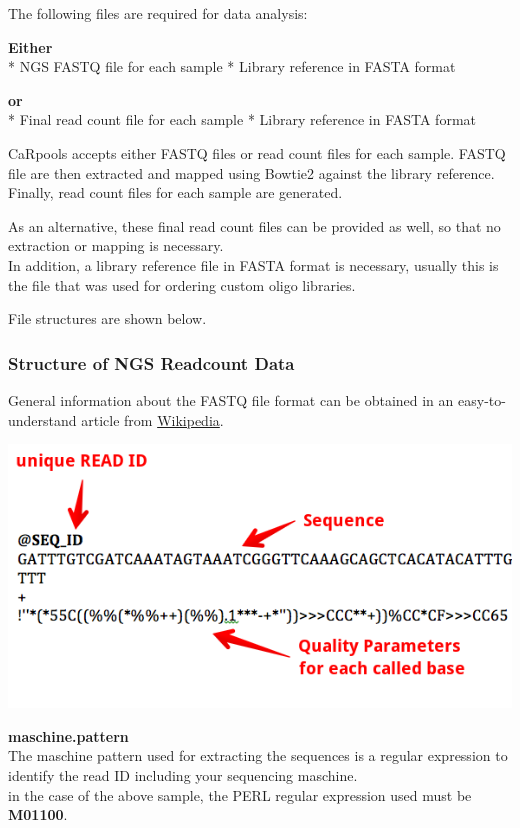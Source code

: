 \documentclass[]{article}
\begin{document}
The following files are required for data analysis:

\textbf{Either}\\
* NGS FASTQ file for each sample * Library reference in FASTA format

\textbf{or}\\
* Final read count file for each sample * Library reference in FASTA
format

CaRpools accepts either FASTQ files or read count files for each sample.
FASTQ file are then extracted and mapped using Bowtie2 against the
library reference. Finally, read count files for each sample are
generated.

As an alternative, these final read count files can be provided as well,
so that no extraction or mapping is necessary.\\
In addition, a library reference file in FASTA format is necessary,
usually this is the file that was used for ordering custom oligo
libraries.

File structures are shown below.

\subsubsection{Structure of NGS Readcount
Data}\label{structure-of-ngs-readcount-data}

General information about the FASTQ file format can be obtained in an
easy-to-understand article from
\href{https://en.wikipedia.org/wiki/FASTQ_format}{Wikipedia}.

\includegraphics{./pictures/fastq-format.png}

\textbf{maschine.pattern}\\
The maschine pattern used for extracting the sequences is a regular
expression to identify the read ID including your sequencing maschine.\\
in the case of the above sample, the PERL regular expression used must
be \textbf{M01100}.
\end{document}
